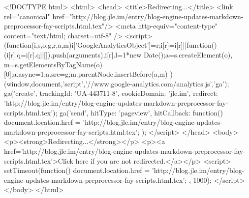 <!DOCTYPE html>
<html>
<head>
<title>Redirecting...</title>
<link rel="canonical" href="http://blog.jle.im/entry/blog-engine-updates-markdown-preprocessor-fay-scripts.html.tex"/>
<meta http-equiv="content-type" content="text/html; charset=utf-8" />
<script>
(function(i,s,o,g,r,a,m){i['GoogleAnalyticsObject']=r;i[r]=i[r]||function(){
(i[r].q=i[r].q||[]).push(arguments)},i[r].l=1*new Date();a=s.createElement(o),
m=s.getElementsByTagName(o)[0];a.async=1;a.src=g;m.parentNode.insertBefore(a,m)
})(window,document,'script','//www.google-analytics.com/analytics.js','ga');
ga('create', { trackingId: 'UA-443711-8', cookieDomain: 'jle.im', redirect: 'http://blog.jle.im/entry/blog-engine-updates-markdown-preprocessor-fay-scripts.html.tex'});
ga('send', { hitType: 'pageview', hitCallback: function() { document.location.href = 'http://blog.jle.im/entry/blog-engine-updates-markdown-preprocessor-fay-scripts.html.tex'; } });
</script>
</head>
<body>
  <p><strong>Redirecting...</strong></p>
  <p><a href='http://blog.jle.im/entry/blog-engine-updates-markdown-preprocessor-fay-scripts.html.tex'>Click here if you are not redirected.</a></p>
  <script>
    setTimeout(function() { document.location.href = 'http://blog.jle.im/entry/blog-engine-updates-markdown-preprocessor-fay-scripts.html.tex'; }, 1000);
  </script>
</body>
</html>

